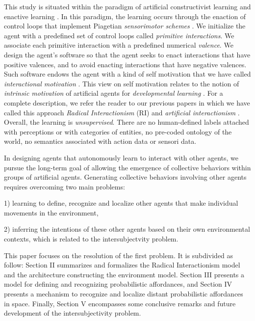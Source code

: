 \documentclass[conference]{IEEEtran}
\begin{document}
This study is situated within the paradigm of artificial constructivist learning \cite[e.g.]{wang_new_2012} and enactive learning \cite[e.g.]{froese2009enactiveAI}. 
In this paradigm, the learning occurs through the enaction of control loops that implement Piagetian \textit{sensorimotor schemes} \cite{piaget:reality}.  
We initialize the agent with a predefined set of control loops called \textit{primitive interactions}. 
We associate each primitive interaction with a predefined numerical \textit{valence}.
We design the agent's software so that the agent seeks to enact interactions that have positive valences, and to avoid enacting interactions that have negative valences. 
Such software endows the agent with a kind of self motivation that we have called \textit{interactional motivation} \cite{georgeon_interactional_2012}.
This view on self motivation relates to the notion of \textit{intrinsic motivation} of artificial agents for \textit{developmental learning} \cite[e.g.]{oudeyer_intrinsic_2007}.
For a complete description, we refer the reader to our previous papers in which we have called this approach \textit{Radical Interactionism} (RI) \cite{georgeon:radical} and \textit{artificial interactionism} \cite{GuillerminGeorgeon2022}. 
Overall, the learning is \textit{unsupervised}. 
There are no human-defined labels attached with perceptions or with categories of entities, no pre-coded ontology of the world, no semantics associated with action data or sensori data.  


In designing agents that autonomously learn to interact with other agents, we pursue the long-term goal of allowing the emergence of collective behaviors within groups of artificial agents. Generating collective behaviors involving other agents requires overcoming two main problems:

1) learning to define, recognize and localize other agents that make individual movements in the environment,

2) inferring the intentions of these other agents based on their own environmental contexts, which is related to the intersubjectvity problem.

This paper focuses on the resolution of the first problem. 
It is subdivided as follow: Section II summarizes and formalizes the Radical Interactionism model and the architecture constructing the environment model. Section III presents a model for defining and recognizing probabilistic affordances, and Section IV presents a mechanism to recognize and localize distant probabilistic affordances in space. Finally, Section V encompasses some conclusive remarks and future development of the intersubjectivity problem.
\end{document}
